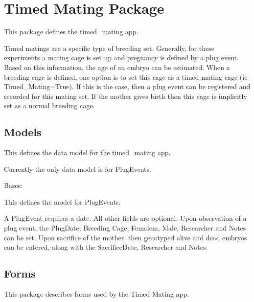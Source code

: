 \documentclass[letterpaper,10pt,english]{sphinxmanual}
\begin{document}
\section{Timed Mating Package}
\label{api:module-timed_mating}\label{api:timed-mating-package}
This package defines the timed\_mating app.

Timed matings are a specific type of breeding set.  
Generally, for these experiments a mating cage is set up and pregnancy is defined by a plug event.  
Based on this information, the age of an embryo can be estimated.  
When a breeding cage is defined, one option is to set this cage as a timed mating cage (ie Timed\_Mating=True).  
If this is the case, then a plug event can be registered and recorded for this mating set.  
If the mother gives birth then this cage is implicitly set as a normal breeding cage.


\subsection{Models}
\label{api:id5}\label{api:module-timed_mating.models}
This defines the data model for the timed\_mating app.

Currently the only data model is for PlugEvents.

\begin{fulllineitems}
\label{api:timed_mating.models.PlugEvents}
Bases: 

This defines the model for PlugEvents.

A PlugEvent requires a date.  All other fields are optional.
Upon observation of a plug event, the PlugDate, Breeding Cage, Femalem, Male, Researcher and Notes can be set.
Upon sacrifice of the mother, then genotyped alive and dead embryos can be entered, along with the SacrificeDate, Researcher and Notes.

\end{fulllineitems}



\subsection{Forms}
\label{api:id6}\label{api:module-timed_mating.forms}
This package describes forms used by the Timed Mating app.
\end{document}

